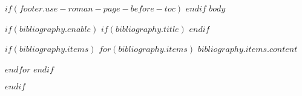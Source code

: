 \documentclass[$if(fontsize)$$fontsize$$else$10pt$endif$, $if(papersize)$$papersize$$else$a4paper$endif$, oneside]{book}
\begin{document}
$if(footer.use-roman-page-before-toc)$
$endif$
$body$

$if(bibliography.enable)$
$if(bibliography.title)$
\renewcommand\bibname{$bibliography.title$}
$endif$
\begin{thebibliography}{9}\label{thebibliography}

$if(bibliography.items)$
$for(bibliography.items)$
$bibliography.items.content$

$endfor$
$endif$
\end{thebibliography}
$endif$

\printindex
\end{document}
